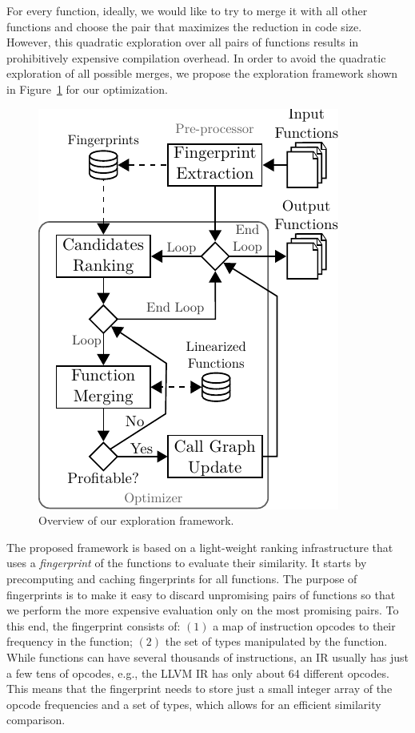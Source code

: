 For every function, ideally, we would like to try to merge it with all other functions and choose the pair that maximizes the reduction in
code size. However, this quadratic exploration over all pairs of functions results in prohibitively expensive compilation
overhead. In order to avoid the quadratic exploration of all possible merges, we propose the exploration framework shown in
Figure~\ref{fig:func-merge-opt-arch} for our optimization.
\begin{figure}[t!]
  \centering
  \includegraphics[width=0.65\linewidth]{figs/func-merge-opt-arch.pdf}
  \caption{Overview of our exploration framework.}
  \label{fig:func-merge-opt-arch}
\end{figure}

The proposed framework is based on a light-weight ranking infrastructure that uses a \textit{fingerprint} of the functions to evaluate
their similarity. It starts by precomputing and caching fingerprints for all functions. The purpose of fingerprints is to make it easy
to discard unpromising pairs of functions so that we perform the more expensive evaluation only on the most promising pairs.
To this end, the fingerprint consists of: $(1)$ a map of instruction opcodes to their frequency in the function; $(2)$ the set of types
manipulated by the function. While functions can have several thousands of instructions, an IR usually has just a few tens of opcodes,
e.g., the LLVM IR has only about 64 different opcodes. This means that the fingerprint needs to store just a small integer array of the
opcode frequencies and a set of types, which allows for an efficient similarity comparison.

